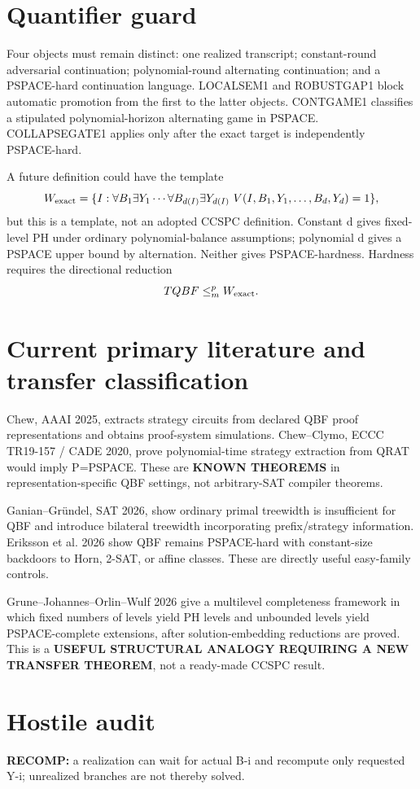 \documentclass[11pt]{article}
\begin{document}
\section*{Quantifier guard}
Four objects must remain distinct: one realized transcript; constant-round adversarial continuation; polynomial-round alternating continuation; and a PSPACE-hard continuation language. LOCALSEM1 and ROBUSTGAP1 block automatic promotion from the first to the latter objects. CONTGAME1 classifies a stipulated polynomial-horizon alternating game in PSPACE. COLLAPSEGATE1 applies only after the exact target is independently PSPACE-hard.

A future definition could have the template
\[
W_{\rm exact}=\{I:\forall B_1\exists Y_1\cdots\forall B_{d(I)}\exists Y_{d(I)}
\ V(I,B_1,Y_1,\ldots,B_d,Y_d)=1\},
\]
but this is a template, not an adopted CCSPC definition. Constant d gives fixed-level PH under ordinary polynomial-balance assumptions; polynomial d gives a PSPACE upper bound by alternation. Neither gives PSPACE-hardness. Hardness requires the directional reduction
\[
TQBF\le_m^p W_{\rm exact}.
\]

\section*{Current primary literature and transfer classification}
Chew, AAAI 2025, extracts strategy circuits from declared QBF proof representations and obtains proof-system simulations. Chew--Clymo, ECCC TR19-157 / CADE 2020, prove polynomial-time strategy extraction from QRAT would imply P=PSPACE. These are \textbf{KNOWN THEOREMS} in representation-specific QBF settings, not arbitrary-SAT compiler theorems.

Ganian--Gründel, SAT 2026, show ordinary primal treewidth is insufficient for QBF and introduce bilateral treewidth incorporating prefix/strategy information. Eriksson et al. 2026 show QBF remains PSPACE-hard with constant-size backdoors to Horn, 2-SAT, or affine classes. These are directly useful easy-family controls.

Grune--Johannes--Orlin--Wulf 2026 give a multilevel completeness framework in which fixed numbers of levels yield PH levels and unbounded levels yield PSPACE-complete extensions, after solution-embedding reductions are proved. This is a \textbf{USEFUL STRUCTURAL ANALOGY REQUIRING A NEW TRANSFER THEOREM}, not a ready-made CCSPC result.

\section*{Hostile audit}
\textbf{RECOMP:} a realization can wait for actual B-i and recompute only requested Y-i; unrealized branches are not thereby solved.
\end{document}
